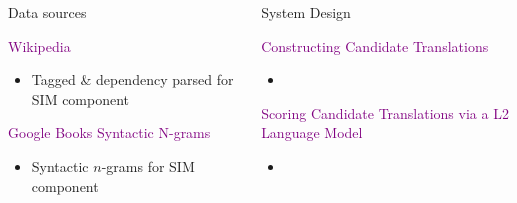 \documentclass[final,t]{beamer}
\begin{document}
\begin{frame}{}
\begin{columns}[t]
\begin{column}{.35\linewidth}
\begin{block}{Data sources}
\begin{center}
\textcolor{purple}{Wikipedia}
\end{center}

\colorbox{light-gray}{
\begin{minipage}{.90\linewidth}
\begin{itemize}
\item Tagged \& dependency parsed for SIM component
\end{itemize}
\end{minipage}
}

\begin{center}
\textcolor{purple}{Google Books Syntactic N-grams}
\end{center}

\colorbox{light-gray}{
\begin{minipage}{.90\linewidth}
\begin{itemize}
\item Syntactic $n$-grams for SIM component
\end{itemize}
\end{minipage}
}

\end{block}

\end{column}

\begin{column}{.6\linewidth}


\begin{block}{System Design}

\begin{center}
  \textcolor{purple}{Constructing Candidate Translations}
  \begin{itemize}
  \item 
  \end{itemize}

  \textcolor{purple}{Scoring Candidate Translations via a L2 Language Model}
  \begin{itemize}
  \item 
  \end{itemize}





\end{center}
\end{block}
\end{column}
\end{columns}
\end{frame}
\end{document}
